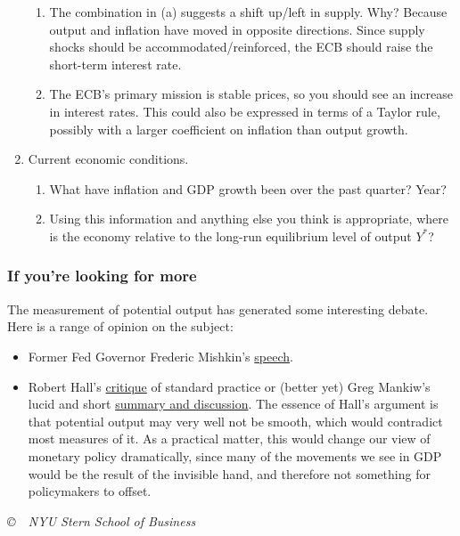 \documentclass[letterpaper,12pt]{article}
\begin{document}
\begin{enumerate}
\begin{enumerate}
\item The combination in (a) suggests a shift up/left in supply.
Why?  Because output and inflation have moved in opposite directions.
Since supply shocks should be accommodated/reinforced,
the ECB should raise the short-term interest rate.

\item The ECB's primary mission is stable prices,
so you should see an increase in interest rates.
This could also be expressed in terms of a Taylor rule,
possibly with a larger coefficient on inflation
than output growth.
\end{enumerate}

\item Current economic conditions. 
\begin{enumerate}
\item  What have inflation and GDP growth been over the past quarter?  Year?
\item Using this information and anything else you think is appropriate, 
where is the economy relative to the long-run equilibrium level of output $Y^*$?  
\end{enumerate}
\end{enumerate}


\subsubsection*{If you're looking for more}

The measurement of potential output has generated some interesting debate.
Here is a range of opinion on the subject:
%
\begin{itemize}
\item Former Fed Governor Frederic Mishkin's
\href{http://www.federalreserve.gov/newsevents/speech/mishkin20070524a.htm}{speech}.

\item Robert Hall's
\href{http://www.kc.frb.org/publicat/Sympos/2005/PDF/Hall2005.pdf}{critique} of standard practice or
(better yet) Greg Mankiw's lucid and short
\href{http://www.kc.frb.org/publicat/Sympos/2005/PDF/Mankiw2005.pdf}{summary and discussion}.
The essence of Hall's argument is that potential output may very well not be smooth,
which would contradict most measures of it.
As a practical matter, this would change our view of monetary policy dramatically,
since many of the movements we see in GDP would be the result of the invisible hand,
and therefore not something for policymakers to offset.

\end{itemize}

\vfill \centerline{\it \copyright \ \number\year \ NYU Stern
School of Business}
\end{document}
